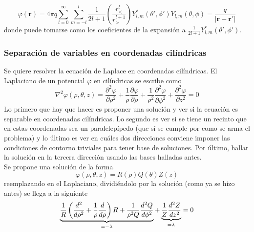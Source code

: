 \begin{equation}
    \varphi(\textbf{r})
    = 4\pi q
    \sum\limits_{l = 0}^{\infty}
    \sum\limits_{m = -l}^{l}
    \frac{1}{2l + 1}
    \left(
        \frac{r_{<}^{l}}{r_{>}^{l+1}}
    \right)
    Y_{l,m}^{*}(\theta', \phi')
    Y_{l,m}(\theta, \phi)
    = \frac{q}{|\textbf{r}-\textbf{r}'|}
        \label{ec:DesarrolloEsfericas}
\end{equation}
donde puede tomarse como los coeficientes de la expansión a $\frac{1}{2l+1}Y_{l,m}^{*}(\theta',\phi')$.



\subsubsection{Separación de variables en coordenadas cilíndricas}
Se quiere resolver la ecuación de Laplace en coordenadas cilíndricas. El Laplaciano de un potencial $\varphi$ en cilíndricas se escribe como
\begin{equation*}
    \nabla^{2}\varphi(\rho,\theta, z) 
    = 
    \frac{\partial^{2}\varphi}{\partial \rho^{2}}
    +
    \frac{1}{\rho}\frac{\partial \varphi}{\partial \rho}
    +
    \frac{1}{\rho^{2}}\frac{\partial^{2}\varphi}{\partial \phi^{2}}
    +
    \frac{\partial^{2}\varphi}{\partial z^{2}}
    = 0
\end{equation*}
Lo primero que hay que hacer es proponer una solución y ver si la ecuación es separable en coordenadas cilíndricas. Lo segundo es ver si se tiene un recinto que en estas coordenadas sea un paralelepípedo (que sí se cumple por como se arma el problema) y lo último es ver en cuáles dos direcciones conviene imponer las condiciones de contorno triviales para tener base de soluciones. Por último, hallar la solución en la tercera dirección usando las bases halladas antes.\\
\indent Se propone una solución de la forma
\begin{equation*}
    \varphi(\rho,\theta,z) = R(\rho)Q(\theta)Z(z)
\end{equation*}
reemplazando en el Laplaciano, dividiéndolo por la solución (como ya se hizo antes) se llega a la siguiente
\begin{equation*}
    \underbrace%
    {%
        \frac{1}{R}
        \left(
            \frac{d^{2}}{d\rho^{2}} 
            + \frac{1}{\rho}\frac{d}{d\rho}
        \right)R
        +
        \frac{1}{\rho^{2}Q}\frac{d^{2}Q}{d\phi^{2}}
    }_{= -\lambda}
    +
    \underbrace%
    {%
        \frac{1}{Z}\frac{d^{2}Z}{dz^{2}}
    }_{= \lambda}
    = 0
\end{equation*}
